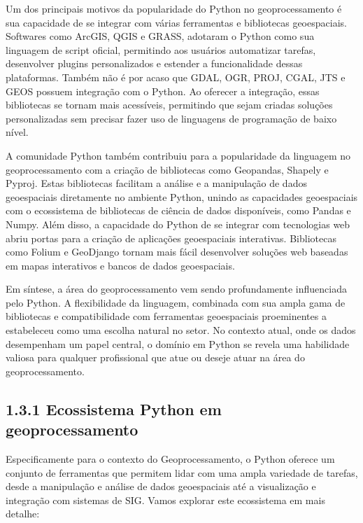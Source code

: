 \documentclass[letterpaper,10pt,english]{jupyterBook}
\begin{document}
\sphinxAtStartPar
Um dos principais motivos da popularidade do Python no geoprocessamento é sua capacidade de se integrar com várias ferramentas e bibliotecas geoespaciais. Softwares como ArcGIS, QGIS e GRASS, adotaram o Python como sua linguagem de script oficial, permitindo aos usuários automatizar tarefas, desenvolver plugins personalizados e estender a funcionalidade dessas plataformas. Também não é por acaso que GDAL, OGR, PROJ, CGAL, JTS e GEOS possuem integração com o Python. Ao oferecer a integração, essas bibliotecas se tornam mais acessíveis, permitindo que sejam criadas soluções personalizadas sem precisar fazer uso de linguagens de programação de baixo nível.

\sphinxAtStartPar
A comunidade Python também contribuiu para a popularidade da linguagem no geoprocessamento com a criação de bibliotecas como Geopandas, Shapely e Pyproj. Estas bibliotecas facilitam a análise e a manipulação de dados geoespaciais diretamente no ambiente Python, unindo as capacidades geoespaciais com o ecossistema de bibliotecas de ciência de dados disponíveis, como Pandas e Numpy. Além disso, a capacidade do Python de se integrar com tecnologias web abriu portas para a criação de aplicações geoespaciais interativas. Bibliotecas como Folium e GeoDjango tornam mais fácil desenvolver soluções web baseadas em mapas interativos e bancos de dados geoespaciais.

\sphinxAtStartPar
Em síntese, a área do geoprocessamento vem sendo profundamente influenciada pelo Python. A flexibilidade da linguagem, combinada com sua ampla gama de bibliotecas e compatibilidade com ferramentas geoespaciais proeminentes a estabeleceu como uma escolha natural no setor. No contexto atual, onde os dados desempenham um papel central, o domínio em Python se revela uma habilidade valiosa para qualquer profissional que atue ou deseje atuar na área do geoprocessamento.


\subsection{1.3.1 Ecossistema Python em geoprocessamento}
\label{\detokenize{introducao:ecossistema-python-em-geoprocessamento}}
\sphinxAtStartPar
Especificamente para o contexto do Geoprocessamento, o Python oferece um conjunto de ferramentas que permitem lidar com uma ampla variedade de tarefas, desde a manipulação e análise de dados geoespaciais até a visualização e integração com sistemas de SIG. Vamos explorar este ecossistema em mais detalhe:
\end{document}
